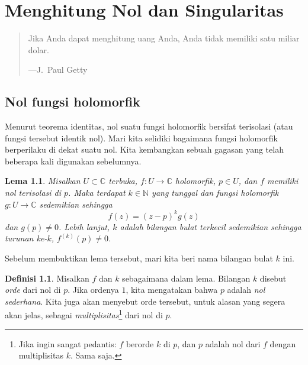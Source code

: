 \documentclass[12pt,openany]{book}
\newcommand{\C}{{\mathbb{C}}}
\newcommand{\N}{{\mathbb{N}}}
\newcommand{\myindex}[1]{#1\index{#1}}
\theoremstyle{plain}
\newtheorem{lemma}[thm]{Lema}
\theoremstyle{remark}
\theoremstyle{definition}
\newtheorem{defn}[thm]{Definisi}
\newenvironment{myepigraph}{%
    \begin{quote}%
    \begingroup\itshape
}{%
    \endgroup%
    \end{quote}
}
\theoremstyle{exercise}
\theoremstyle{example}
\begin{document}

\chapter{Menghitung Nol dan Singularitas} \label{ch:counting}

\begin{myepigraph}
Jika Anda dapat menghitung uang Anda, Anda tidak memiliki satu miliar dolar.

---J.\ Paul Getty
\end{myepigraph}


\section{Nol fungsi holomorfik}

Menurut teorema identitas, nol suatu fungsi holomorfik bersifat
terisolasi (atau fungsi tersebut identik nol). Mari kita selidiki bagaimana
fungsi holomorfik berperilaku di dekat suatu nol.
Kita kembangkan sebuah gagasan yang telah beberapa kali digunakan sebelumnya.

\begin{lemma}
Misalkan $U \subset \C$ terbuka, $f \colon U \to \C$ holomorfik, $p \in U$,
dan $f$ memiliki nol terisolasi di $p$.
Maka terdapat $k \in \N$ yang tunggal dan fungsi holomorfik $g \colon U
\to \C$ sedemikian sehingga
\begin{equation*}
f(z) = {(z-p)}^k g(z)
\end{equation*}
dan $g(p) \neq 0$.
Lebih lanjut, $k$ adalah bilangan bulat terkecil sedemikian sehingga turunan
ke-$k$, $f^{(k)}(p) \neq 0$.
\end{lemma}

Sebelum membuktikan lema tersebut, mari kita beri nama bilangan bulat $k$ ini.

\begin{defn}
Misalkan $f$ dan $k$ sebagaimana dalam lema.
Bilangan $k$ disebut \emph{orde}
dari nol di $p$.
Jika ordenya $1$, kita mengatakan bahwa $p$ adalah \emph{\myindex{nol sederhana}}.
Kita juga akan menyebut orde tersebut, untuk alasan yang segera akan jelas,
sebagai \emph{multiplisitas}\footnote{%
Jika ingin sangat pedantis: $f$ berorde $k$ di $p$,
dan $p$ adalah nol dari $f$ dengan multiplisitas $k$. Sama saja.}
dari nol di $p$.
\end{defn}
\end{document}
